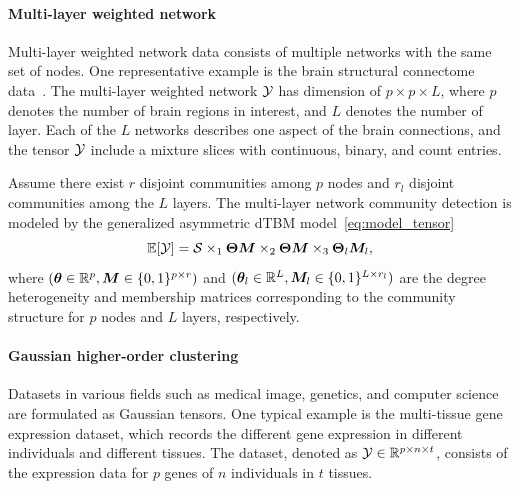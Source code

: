 \documentclass[lettersize,onecolumn,journal]{IEEEtran}
\theoremstyle{definition}
\theoremstyle{definition}
\begin{document}
{\vspace{0.2cm}
\paragraph{Multi-layer weighted network} 
Multi-layer weighted network data consists of multiple networks with the same set of nodes. One representative example is the brain structural connectome data~\citep{zhang2019tensor}. The multi-layer weighted network $\mathcal{Y}$ has dimension of $p \times p \times L$, where $p$ denotes the number of brain regions in interest, and $L$ denotes the number of layer. Each of the $L$ networks describes one aspect of the brain connections, and the tensor $\mathcal{Y}$ include a mixture slices with continuous, binary, and count entries. 


Assume there exist $r$ disjoint communities among $p$ nodes and $r_l$ disjoint communities among the $L$ layers. The multi-layer network community detection is modeled by the generalized asymmetric dTBM model~\eqref{eq:model_tensor}
\begin{equation}
    \mathbb{E}[\mathcal{Y}] = \mathcal{S} \times_1 \boldsymbol{\Theta} \bm M \times_2 \boldsymbol{\Theta} \bm M \times_3 \boldsymbol{\Theta}_l \bm M_l, 
\end{equation}
where $(\boldsymbol{\theta} \in \mathbb{R}^p, \bm M \in \{0,1\}^{p \times r})$ and $ (\boldsymbol{\theta}_l \in \mathbb{R}^L, \bm M_l \in \{0,1\}^{L \times r_l})$ are the degree heterogeneity and membership matrices corresponding to the community structure for $p$ nodes and $L$ layers, respectively. 
\vspace{0.2cm}

\paragraph{Gaussian higher-order clustering} Datasets in various fields such as medical image, genetics, and computer science are formulated as Gaussian tensors. One typical example is the multi-tissue gene expression dataset, which records the different gene expression in different individuals and different tissues. The dataset, denoted as $\mathcal{Y} \in \mathbb{R}^{p \times n \times t}$, consists of the expression data for $p$ genes of $n$ individuals in $t$ tissues. 

}
\end{document}
